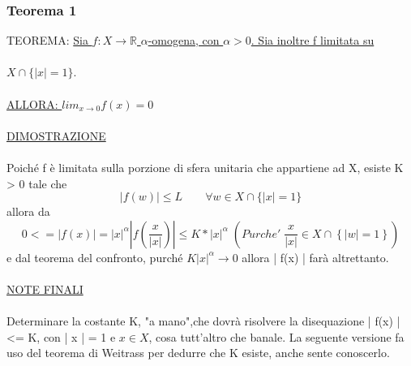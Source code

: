 \documentclass[fontsize = 20px, paper = a4]{article}
\begin{document}
\subsubsection{Teorema 1}
TEOREMA: \underline{Sia $f:X\rightarrow \mathbb{R}$ $\alpha$-omogena, con $\alpha > 0$. Sia inoltre f limitata su }\\ \\
\hspace*{2cm} \underline{$X \cap \{| x | = 1\}$}.\\ \\
\underline{ALLORA: $lim_{x \to 0} f(x) = 0$}\\ \\
\underline{DIMOSTRAZIONE }\\ \\
Poiché f è limitata sulla porzione di sfera unitaria che appartiene ad X, esiste K > 0 tale che 
$$| f(w) | \le L \qquad \forall w \in X \cap \{ | x | = 1 \}$$
allora da 
$$0 <= | f(x) | = | x |^\alpha | f \left( \frac{x}{| x | } \right )| \le K* | x |^\alpha \; (Purche' \; \frac{x}{|x|} \in X \cap \left \{ |w| = 1 \right \})$$
e dal teorema del confronto, purché $K|x|^\alpha \rightarrow 0$ allora | f(x) | farà altrettanto.\\ \\
\underline{NOTE FINALI} \\ \\
Determinare la costante K, "a mano",che dovrà risolvere la disequazione | f(x) |<= K, con | x | = 1
e $x \in X$, cosa tutt'altro che banale. La seguente versione fa uso del teorema di Weitrass per dedurre che K esiste, anche sente conoscerlo.
\end{document}
